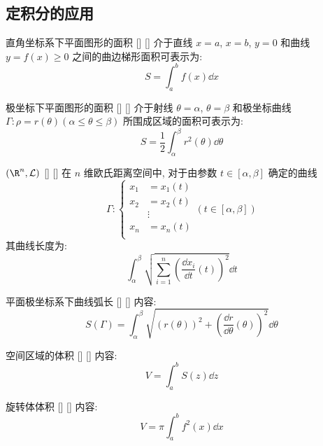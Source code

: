 \documentclass[UTF8]{ctexart}
\begin{document}
		\subsection{定积分的应用}
				
			\begin{thm}
			    []
			    {直角坐标系下平面图形的面积}
			    []
			    []
				介于直线 \(x=a\), \(x=b\), \(y=0\) 和曲线 \(y=f(x)\geq 0\) 之间的曲边梯形面积可表示为: 
				\[S=\int_a^b f(x)\dd x\]
			\end{thm}

			\begin{crl}
			    []
			    {极坐标下平面图形的面积}
			    []
			    []
				介于射线 \(\theta=\alpha\), \(\theta=\beta\) 和极坐标曲线 \(\varGamma: \rho=r(\theta)(\alpha\leq\theta\leq\beta)\) 所围成区域的面积可表示为: 
				\[S=\frac{1}{2}\int_\alpha^\beta r^2(\theta)\dd\theta\]
			\end{crl}

			\begin{thm}
			    []
			    { \((\R^n,\mathcal{L})\) }
			    []
			    []
				在 \(n\) 维欧氏距离空间中, 对于由参数 \(t\in[\alpha,\beta]\) 确定的曲线
				\[\varGamma:
				\begin{cases}
					x_1 & = x_1(t)\\
					x_2 & = x_2(t)\\
					& \vdots\\
					x_n & = x_n(t)\\
				\end{cases}
				(t\in[\alpha,\beta])\]
				其曲线长度为: 
				\[\int_\alpha^\beta\sqrt{\sum_{i=1}^{n}{\left(\frac{\dd x_i}{\dd t}(t)\right)}^2}\dd t\]
			\end{thm}

			\begin{crl}
			    []
			    {平面极坐标系下曲线弧长}
			    []
			    []
				内容: 
				\[S(\varGamma)=\int_\alpha^\beta\sqrt{{(r(\theta))}^2+{\left(\frac{\dd r}{\dd\theta}(\theta)\right)}^2}\dd\theta\]
			\end{crl}

			\begin{thm}
			    []
			    {空间区域的体积}
			    []
			    []
				内容: 
				\[V=\int_a^b S(z)\dd z\]
			\end{thm}

			\begin{crl}
			    []
			    {旋转体体积}
			    []
			    []
				内容: 
				\[V=\pi\int_a^b f^2(x)\dd x\]
			\end{crl}
\end{document}
